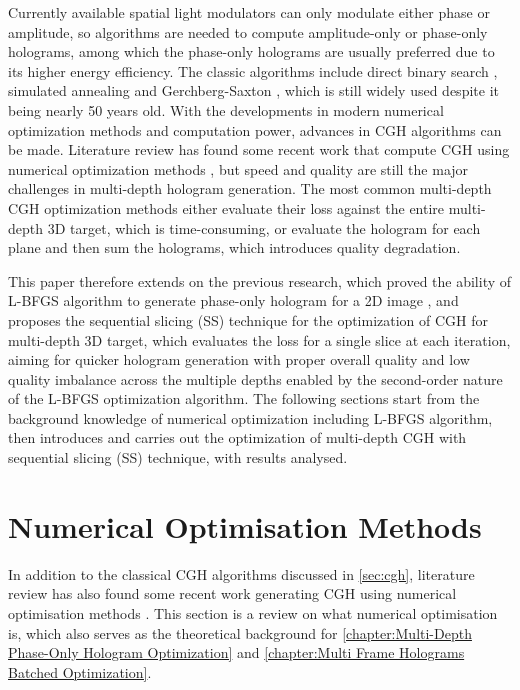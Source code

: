 Currently available spatial light modulators can only modulate either phase or amplitude, so algorithms are needed to compute amplitude-only or phase-only holograms, among which the phase-only holograms are usually preferred due to its higher energy efficiency. The classic algorithms include direct binary search \cite{Seldowitz1987}, simulated annealing \cite{Kirkpatrick1983} and Gerchberg-Saxton \cite{Gerchberg1972}, which is still widely used despite it being nearly 50 years old. With the developments in modern numerical optimization methods and computation power, advances in CGH algorithms can be made. Literature review has found some recent work that compute CGH using numerical optimization methods \cite{Zhang2017, Liu2020, Choi2021, Chen2021, Kadis2022}, but speed and quality are still the major challenges in multi-depth hologram generation. The most common multi-depth CGH optimization methods either evaluate their loss against the entire multi-depth 3D target, which is time-consuming, or evaluate the hologram for each plane and then sum the holograms, which introduces quality degradation.

This paper therefore extends on the previous research, which proved the ability of L-BFGS algorithm to generate phase-only hologram for a 2D image \cite{Sha2022}, and proposes the sequential slicing (SS) technique for the optimization of CGH for multi-depth 3D target, which evaluates the loss for a single slice at each iteration, aiming for quicker hologram generation with proper overall quality and low quality imbalance across the multiple depths enabled by the second-order nature of the L-BFGS optimization algorithm. The following sections start from the background knowledge of numerical optimization including L-BFGS algorithm, then introduces and carries out the optimization of multi-depth CGH with sequential slicing (SS) technique, with results analysed.






\section{Numerical Optimisation Methods} \label{sec:Numerical Optimisation Methods}
In addition to the classical CGH algorithms discussed in \cref{sec:cgh}, literature review has also found some recent work generating CGH using numerical optimisation methods \cite{Zhang2017, Liu2020, Choi2021, Chen2021}. This section is a review on what numerical optimisation is, which also serves as the theoretical background for \cref{chapter:Multi-Depth Phase-Only Hologram Optimization} and \cref{chapter:Multi Frame Holograms Batched Optimization}.

